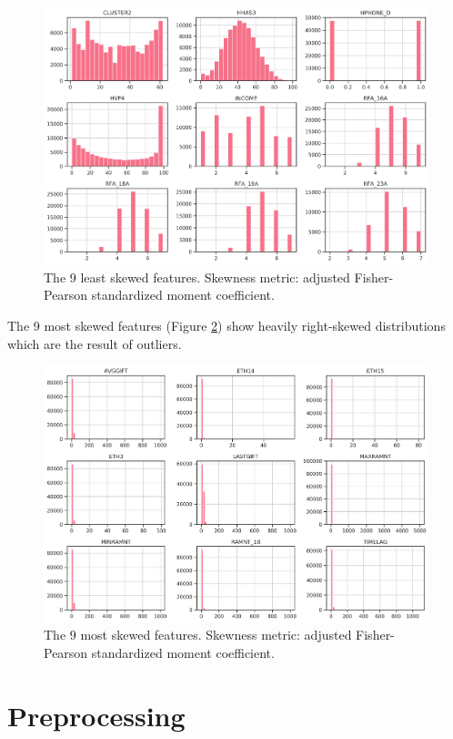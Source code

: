 \documentclass[
  11pt,
  a4paper,
  DIV=12,captions=tableheading,oneside]{scrbook}
\begin{document}
\begin{figure}

{\centering \includegraphics[width=0.7\linewidth]{figures/eda/least-skewed} 

}

\caption{The 9 least skewed features. Skewness metric: adjusted Fisher-Pearson standardized moment coefficient.}\label{fig:least-skewed}
\end{figure}

The 9 most skewed features (Figure \ref{fig:most-skewed}) show heavily right-skewed distributions which are the result of outliers.

\begin{figure}

{\centering \includegraphics[width=0.7\linewidth]{figures/eda/most-skewed} 

}

\caption{The 9 most skewed features. Skewness metric: adjusted Fisher-Pearson standardized moment coefficient.}\label{fig:most-skewed}
\end{figure}

\hypertarget{preprocessing}{%
\section{Preprocessing}\label{preprocessing}}
\end{document}
